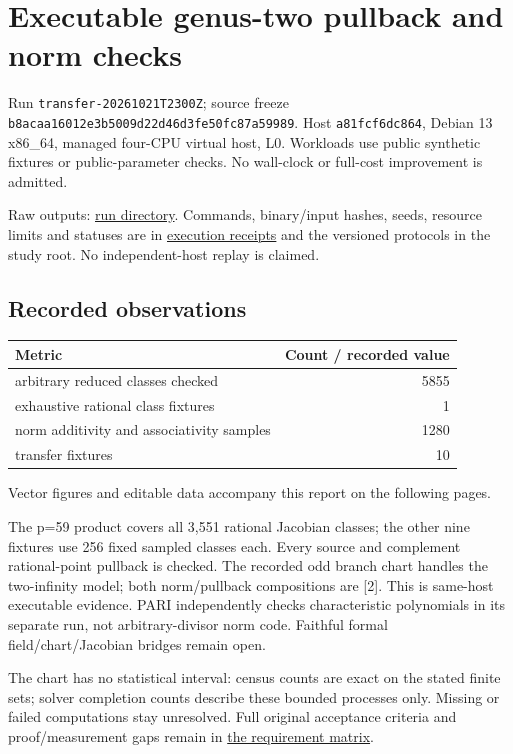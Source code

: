 \documentclass[
  10pt,
  letterpaper,
  landscape]{article}
\author{}
\date{}
\begin{document}
\section{Executable genus-two pullback and norm
checks}\label{executable-genus-two-pullback-and-norm-checks}

Run \texttt{transfer-20261021T2300Z}; source freeze
\texttt{b8acaa16012e3b5009d22d46d3fe50fc87a59989}. Host
\texttt{a81fcf6dc864}, Debian 13 x86\_64, managed four-CPU virtual host,
L0. Workloads use public synthetic fixtures or public-parameter checks.
No wall-clock or full-cost improvement is admitted.

Raw outputs:
\href{../../../execution-v1/runs/transfer-20261021T2300Z/}{run
directory}. Commands, binary/input hashes, seeds, resource limits and
statuses are in \href{../../../execution-v1/}{execution receipts} and
the versioned protocols in the study root. No independent-host replay is
claimed.

\subsection{Recorded observations}\label{recorded-observations}

\begin{longtable}[]{@{}lr@{}}
\toprule\noalign{}
Metric & Count / recorded value \\
\midrule\noalign{}
\endhead
\bottomrule\noalign{}
\endlastfoot
arbitrary reduced classes checked & 5855 \\
exhaustive rational class fixtures & 1 \\
norm additivity and associativity samples & 1280 \\
transfer fixtures & 10 \\
\end{longtable}

Vector figures and editable data accompany this report on the following pages.

The p=59 product covers all 3,551 rational Jacobian classes; the other
nine fixtures use 256 fixed sampled classes each. Every source and
complement rational-point pullback is checked. The recorded odd branch
chart handles the two-infinity model; both norm/pullback compositions
are {[}2{]}. This is same-host executable evidence. PARI independently
checks characteristic polynomials in its separate run, not
arbitrary-divisor norm code. Faithful formal field/chart/Jacobian
bridges remain open.

The chart has no statistical interval: census counts are exact on the
stated finite sets; solver completion counts describe these bounded
processes only. Missing or failed computations stay unresolved. Full
original acceptance criteria and proof/measurement gaps remain in
\href{../../../EXPERIMENTS.md}{the requirement matrix}.
\end{document}
